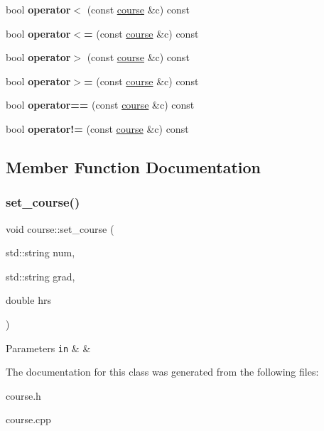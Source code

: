 \begin{DoxyCompactItemize}
\item 
\mbox{\label{classcourse_aa47eab66d21e10a44ff77f634406face}} 
bool {\bfseries operator$<$} (const \hyperlink{classcourse}{course} \&c) const
\item 
\mbox{\label{classcourse_ab96de818d7b97e4e259fc6add5e0bc54}} 
bool {\bfseries operator$<$=} (const \hyperlink{classcourse}{course} \&c) const
\item 
\mbox{\label{classcourse_a16df685718a7ca9e98408b65109897b6}} 
bool {\bfseries operator$>$} (const \hyperlink{classcourse}{course} \&c) const
\item 
\mbox{\label{classcourse_ad15d2508cfb6d22103aaec608bcfdc74}} 
bool {\bfseries operator$>$=} (const \hyperlink{classcourse}{course} \&c) const
\item 
\mbox{\label{classcourse_aafce75fc85cdb94a5a08eaaba359da16}} 
bool {\bfseries operator==} (const \hyperlink{classcourse}{course} \&c) const
\item 
\mbox{\label{classcourse_ae01c5e2445600d485da28e0ba7c48b3a}} 
bool {\bfseries operator!=} (const \hyperlink{classcourse}{course} \&c) const
\end{DoxyCompactItemize}


\subsection{Member Function Documentation}
\mbox{\label{classcourse_a1fce1a16efb3f07d0da5daca8005e4a6}} 
\subsubsection{\texorpdfstring{set\+\_\+course()}{set\_course()}}
{\footnotesize\ttfamily void course\+::set\+\_\+course (\begin{DoxyParamCaption}\item[{std\+::string}]{num,  }\item[{std\+::string}]{grad,  }\item[{double}]{hrs }\end{DoxyParamCaption})}


\begin{DoxyParams}[1]{Parameters}
\mbox{\tt in}  & {\em } & \\
\hline
\end{DoxyParams}


The documentation for this class was generated from the following files\+:\begin{DoxyCompactItemize}
\item 
course.\+h\item 
course.\+cpp\end{DoxyCompactItemize}
